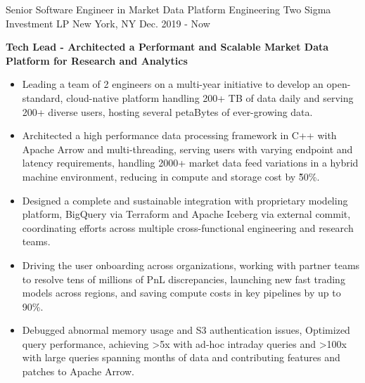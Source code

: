 

\begin{cventries}

  \cventry
    {Senior Software Engineer in Market Data Platform Engineering} %
    {Two Sigma Investment LP} %
    {New York, NY} %
    {Dec. 2019 - Now} %
    {
      \begin{cvitems} %
        \item {\fontsize{10pt}{1em}\bodyfont\bfseries\color{darktext}Tech Lead - Architected a Performant and Scalable Market Data Platform for Research and Analytics}
          \begin{itemize}
              \item {Leading a team of 2 engineers on a multi-year initiative to develop an open-standard, cloud-native platform handling 200+ TB of data daily and serving 200+ diverse users, hosting several petaBytes of ever-growing data.}
              \item {Architected a high performance data processing framework in C++ with Apache Arrow and multi-threading, serving users with varying endpoint and latency requirements, handling 2000+ market data feed variations in a hybrid machine environment, reducing in compute and storage cost by \~50\%.}
              \item {Designed a complete and sustainable integration with proprietary modeling platform, BigQuery via Terraform and Apache Iceberg via external commit, coordinating efforts across multiple cross-functional engineering and research teams.}
              \item {Driving the user onboarding across organizations, working with partner teams to resolve tens of millions of PnL discrepancies, launching new fast trading models across regions, and saving compute costs in key pipelines by up to 90\%.}
              \item {Debugged abnormal memory usage and S3 authentication issues, Optimized query performance, achieving >5x with ad-hoc intraday queries and >100x with large queries spanning months of data and contributing features and patches to Apache Arrow.}

\end{itemize}
\end{cvitems}}
\end{cventries}
